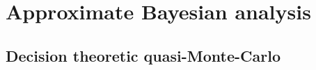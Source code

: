 \part{Approximate Bayesian analysis}

\chapter{Decision theoretic quasi-Monte-Carlo\label{sec:approximate_inference}}

